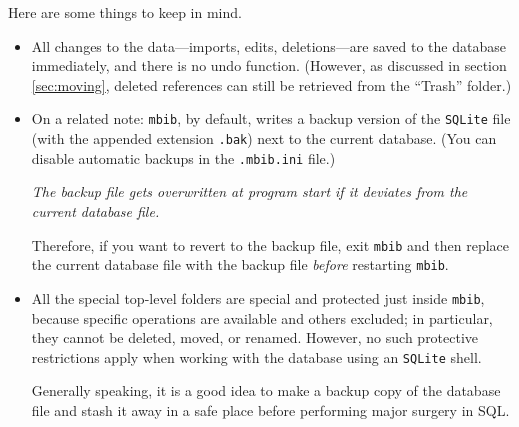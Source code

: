 \documentclass[10pt]{article}
\newcommand*{\mbib}{\texttt{mbib}\xspace}
\newcommand*{\sqlite}{\texttt{SQLite}\xspace}
\newcommand*{\ini}{\texttt{.mbib.ini}\xspace}
\begin{document}
Here are some things to keep in mind. 

\begin{itemize}


\item All changes to the data---imports, edits, deletions---are saved to the database immediately, and there is no undo function. (However, as discussed in section \ref{sec:moving}, deleted references can still be retrieved from the ``Trash'' folder.)

\item On a related note: \mbib, by default, writes a backup version of the \sqlite file (with the appended extension \texttt{.bak}) next to the current database. (You can disable automatic backups in the \ini file.)  

\emph{The backup file gets overwritten at program start if it deviates from the current database file.} 

Therefore, if you want to revert to the backup file, exit \mbib and then replace the current database file with the backup file \emph{before} restarting \mbib.



\item All the special top-level folders are special and protected just inside \mbib, because specific operations are available and others excluded; in particular, they cannot be deleted, moved, or renamed. However, no such protective restrictions apply when working with the database using an \sqlite shell. 

Generally speaking, it is a good idea to make a backup copy of the database file and stash it away in a safe place before performing major surgery in SQL. 
\end{itemize}
\end{document}
